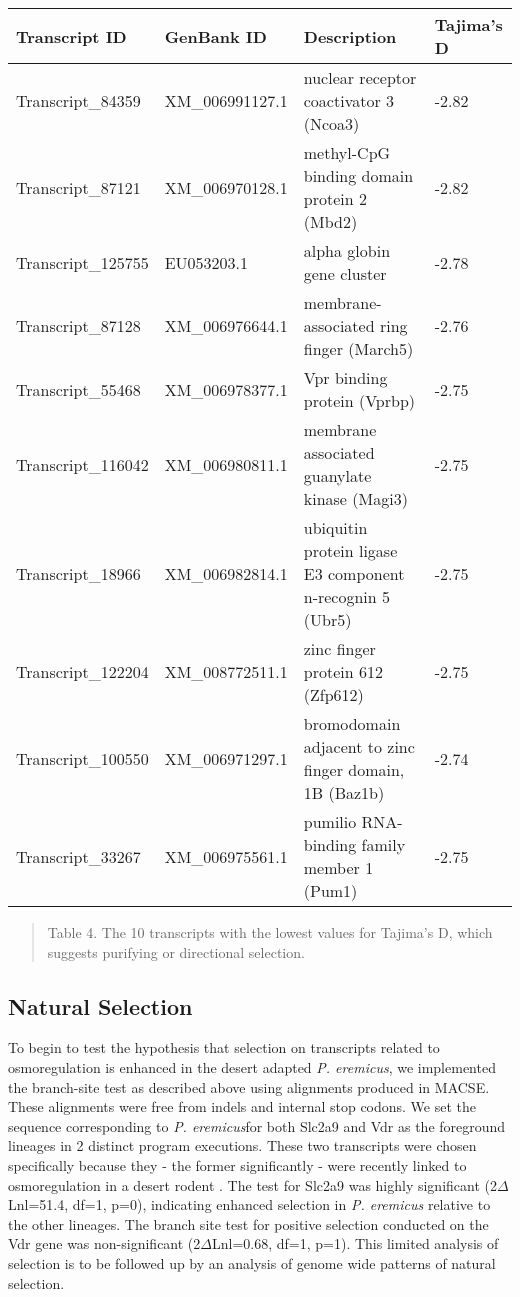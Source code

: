 \documentclass[11pt]{article}
\newcommand{\peer}{\textit{P. eremicus}}
\begin{document}
\begin{center}
\begin{adjustwidth}{-.75in}{-.75in}%
\begin{tabular}{ l l l l }
\textbf{Transcript ID} & \textbf{GenBank ID} & \textbf{Description} & \textbf{Tajima's D} \\
\hline
Transcript\_84359 & XM\_006991127.1 & nuclear receptor coactivator 3 (Ncoa3) & -2.82\\
Transcript\_87121 & XM\_006970128.1 & methyl-CpG binding domain protein 2 (Mbd2) & -2.82 \\
Transcript\_125755 & EU053203.1 & alpha globin gene cluster & -2.78\\
Transcript\_87128 & XM\_006976644.1 & membrane-associated ring finger (March5) & -2.76 \\
Transcript\_55468 & XM\_006978377.1 & Vpr binding protein (Vprbp) & -2.75\\
Transcript\_116042 & XM\_006980811.1 & membrane associated guanylate kinase (Magi3) & -2.75  \\
Transcript\_18966 & XM\_006982814.1 & ubiquitin protein ligase E3 component n-recognin 5 (Ubr5) & -2.75 \\
Transcript\_122204 & XM\_008772511.1 & zinc finger protein 612 (Zfp612) & -2.75 \\
Transcript\_100550 & XM\_006971297.1 & bromodomain adjacent to zinc finger domain, 1B (Baz1b) & -2.74\\
Transcript\_33267 & XM\_006975561.1 & pumilio RNA-binding family member 1 (Pum1) & -2.75\\
 \end{tabular}
\begin{quote}
\small{Table 4. The 10 transcripts with the lowest values for Tajima's D, which suggests purifying or directional selection.}
\end{quote}  
\end{adjustwidth}
\end{center}

\subsection*{Natural Selection}

To begin to test the hypothesis that selection on transcripts related to osmoregulation is enhanced in the desert adapted \peer, we implemented the branch-site test as described above using alignments produced in MACSE. These alignments were free from indels and internal stop codons. We set the sequence corresponding to \peer\:for both Slc2a9 and Vdr as the foreground lineages in 2 distinct program executions. These two transcripts were chosen specifically because they - the former significantly - were recently linked to osmoregulation in a desert rodent \cite{Marra:2014de}. The test for Slc2a9 was highly significant (2$\Delta$Lnl=51.4, df=1, p=0), indicating enhanced selection in \peer\: relative to the other lineages. The branch site test for positive selection conducted on the Vdr gene was non-significant (2$\Delta$Lnl=0.68, df=1, p=1). This limited analysis of selection is to be followed up by an analysis of genome wide patterns of natural selection. \\
\end{document}
